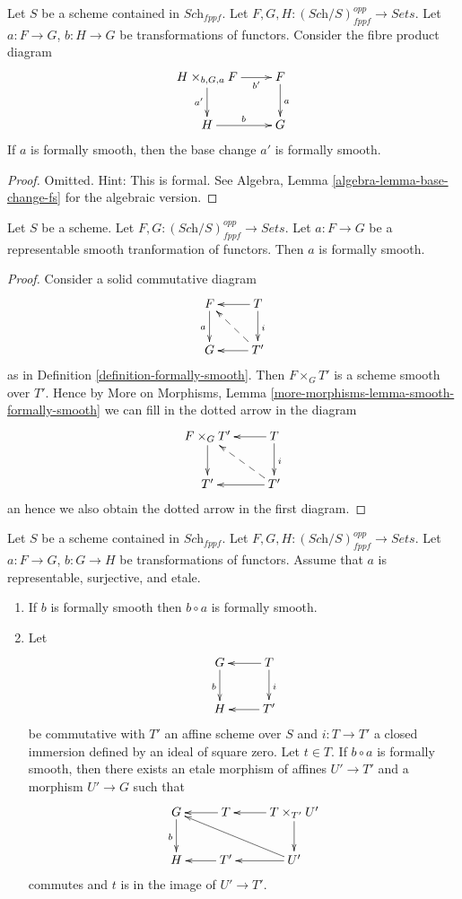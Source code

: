 \begin{lemma}
\label{lemma-base-change-formally-smooth}
Let $S$ be a scheme contained in $\textit{Sch}_{fppf}$.
Let $F, G, H : (\textit{Sch}/S)_{fppf}^{opp} \to \textit{Sets}$.
Let $a : F \to G$, $b : H \to G$ be transformations of functors.
Consider the fibre product diagram
$$
\xymatrix{
H \times_{b, G, a} F \ar[r]_-{b'} \ar[d]_{a'} & F \ar[d]^a \\
H \ar[r]^b & G
}
$$
If $a$ is formally smooth, then the base change $a'$ is
formally smooth.
\end{lemma}

\begin{proof}
Omitted. Hint: This is formal. See
Algebra, Lemma \ref{algebra-lemma-base-change-fs}
for the algebraic version.
\end{proof}

\begin{lemma}
\label{lemma-representable-smooth-formally-smooth}
Let $S$ be a scheme.
Let $F, G : (\textit{Sch}/S)_{fppf}^{opp} \to \textit{Sets}$.
Let $a : F \to G$ be a representable smooth tranformation of functors.
Then $a$ is formally smooth.
\end{lemma}

\begin{proof}
Consider a solid commutative diagram
$$
\xymatrix{
F \ar[d]_a & T \ar[d]^i \ar[l] \\
G & T' \ar[l] \ar@{-->}[lu]
}
$$
as in
Definition \ref{definition-formally-smooth}. Then $F \times_G T'$ is
a scheme smooth over $T'$. Hence by
More on Morphisms, Lemma \ref{more-morphisms-lemma-smooth-formally-smooth}
we can fill in the dotted arrow in the diagram
$$
\xymatrix{
F \times_G T' \ar[d] & T \ar[d]^i \ar[l] \\
T' & T' \ar[l] \ar@{-->}[lu]
}
$$
an hence we also obtain the dotted arrow in the first diagram.
\end{proof}

\begin{lemma}
\label{lemma-etale-on-top}
Let $S$ be a scheme contained in $\textit{Sch}_{fppf}$.
Let $F, G, H : (\textit{Sch}/S)_{fppf}^{opp} \to \textit{Sets}$.
Let $a : F \to G$, $b : G \to H$ be transformations of functors.
Assume that $a$ is representable, surjective, and etale.
\begin{enumerate}
\item If $b$ is formally smooth then $b \circ a$ is formally smooth.
\item Let
$$
\xymatrix{
G \ar[d]_b & T \ar[d]^i \ar[l] \\
H & T' \ar[l]
}
$$
be commutative with $T'$ an affine scheme over $S$
and $i : T \to T'$ a closed immersion defined by an ideal of square zero.
Let $t \in T$. If $b \circ a$ is formally smooth, then there exists an
etale morphism of affines $U' \to T'$ and a morphism $U' \to G$ such that
$$
\xymatrix{
G \ar[d]_b & T \ar[l] & T \times_{T'} U' \ar[d] \ar[l]\\
H & T' \ar[l] & U' \ar[llu] \ar[l]
}
$$
commutes and $t$ is in the image of $U' \to T'$.
\end{enumerate}
\end{lemma}

